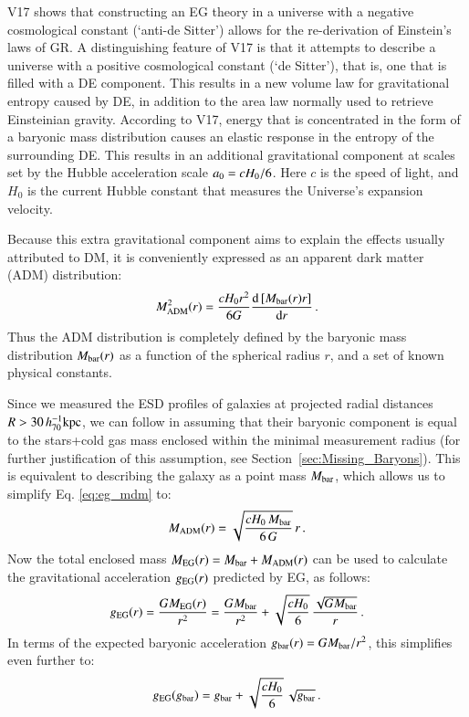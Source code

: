 \documentclass{aa}
\newcommand{\hkpc}{\,h_{70}^{-1}{\rm{kpc}} }
\newcommand{\un}[1]{_{\rm #1}}
\begin{document}
V17 shows that constructing an EG theory in a universe with a negative cosmological constant (`anti-de Sitter') allows for the re-derivation of Einstein's laws of GR. A distinguishing feature of V17 is that it attempts to describe a universe with a positive cosmological constant (`de Sitter'), that is, one that is filled with a DE component. This results in a new volume law for gravitational entropy caused by DE, in addition to the area law normally used to retrieve Einsteinian gravity. According to V17, energy that is concentrated in the form of a baryonic mass distribution causes an elastic response in the entropy of the surrounding DE. This results in an additional gravitational component at scales set by the Hubble acceleration scale $a\un{0} = c H_0/6$. Here $c$ is the speed of light, and $H_0$ is the current Hubble constant that measures the Universe's expansion velocity.

Because this extra gravitational component aims to explain the effects usually attributed to DM, it is conveniently expressed as an apparent dark matter (ADM) distribution:
	\begin{equation}
	M\un{ADM}^2 (r) = \frac{cH_0 r^2}{6G} \frac{{\rm d}\left[ M\un{bar}(r) r \right]}{{\rm d}r} \, .
	\label{eq:eg_mdm}
	\end{equation}
Thus the ADM distribution is completely defined by the baryonic mass distribution $M\un{bar}(r)$ as a function of the spherical radius $r$, and a set of known physical constants.

Since we measured the ESD profiles of galaxies at projected radial distances $R>30 \hkpc$, we can follow \cite{brouwer2017} in assuming that their baryonic component is equal to the stars+cold gas mass enclosed within the minimal measurement radius (for further justification of this assumption, see Section~\ref{sec:Missing_Baryons}). This is equivalent to describing the galaxy as a point mass $M\un{bar}$, which allows us to simplify Eq. \ref{eq:eg_mdm} to:
\begin{equation}
M\un{ADM}(r)=\sqrt{\frac{cH_{0} \, M\un{bar}}{6 \, G}} \, r \, .
\end{equation}
Now the total enclosed mass $M\un{EG}(r) = M\un{bar} + M\un{ADM}(r)$ can be used to calculate the gravitational acceleration $g\un{EG}(r)$ predicted by EG, as follows:
\begin{equation}
g\un{EG}(r) = \frac{G M\un{EG}(r)}{r^2} = \frac{G M\un{bar}}{r^2} + \sqrt{\frac{cH_{0}}{6}} \, \frac{\sqrt{G M\un{bar}}}{r} \, .
\end{equation}
In terms of the expected baryonic acceleration $g\un{bar}(r) = G M\un{bar}/r^2$, this simplifies even further to:
\begin{equation}
\label{eq:rar_verlinde}
g\un{EG}(g\un{bar}) = g\un{bar} + \sqrt{\frac{cH_{0}}{6}} \, \sqrt{g\un{bar}} \, .
\end{equation}
\end{document}
